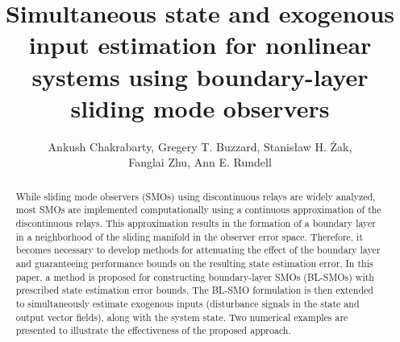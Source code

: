 \documentclass[times, doublespace]{rncauth}
\begin{document}

\title{Simultaneous state and exogenous input estimation for nonlinear systems using boundary-layer sliding mode observers}

\author{Ankush Chakrabarty\corrauth,
	Gregery T. Buzzard, Stanis\l aw H. \.Zak,\\ Fanglai Zhu, Ann E. Rundell}

\address{School of Electrical and Computer Engineering, Purdue University, West Lafayette, IN, USA\break {}Department of Mathematics, Purdue University, West Lafayette, IN, USA\break {} Weldon School of Biomedical Engineering at Purdue University, West Lafayette, IN, USA\break
{} College of Electronics and Information Engineering, Tongji University, Shanghai, P. R. China
}


\begin{abstract}
While sliding mode observers (SMOs) using discontinuous relays are widely analyzed, most SMOs are implemented computationally using a continuous approximation of the discontinuous relays. This approximation results in the formation of a boundary layer in a neighborhood of the sliding manifold in the observer error space. Therefore, it becomes necessary to develop methods for attenuating the effect of the boundary layer and guaranteeing performance bounds on the resulting state estimation error. In this paper, a method is proposed for constructing boundary-layer SMOs (BL-SMOs) with prescribed state estimation error bounds. The BL-SMO formulation is then extended to simultaneously estimate exogenous inputs (disturbance signals in the state and output vector fields), along with the system state. Two numerical examples are presented to illustrate the effectiveness of the proposed approach.
\end{abstract}

\maketitle
\end{document}
